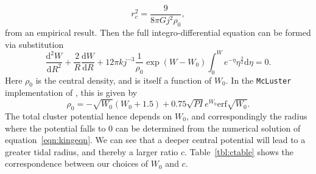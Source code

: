 \documentclass{princeton_astro_thesis}
\numberwithin{equation}{section}
\begin{document}
\begin{equation}
r_{c}^{2} = \frac{9}{8 \pi G j^2 \rho_0},
\end{equation}
from an empirical result. Then the full integro-differential equation can be formed via substitution
\begin{equation}
\frac{\mathrm{d}^2W}{\mathrm{d}R^2} + \frac{2}{R}\frac{\mathrm{d}W}{\mathrm{d}R} + 12 \pi k j^{-3} \frac{1}{\rho_{0}} \exp(W-W_{0}) \int_{0}^{W} e^{-\eta} \eta^\frac{3}{2} \mathrm{d}\eta = 0.
\label{eqn:kingeqn}
\end{equation}
Here $\rho_{0}$ is the central density, and is itself a function of $W_{0}$.  In the \texttt{McLuster} implementation of \citet{2011Kupper}, this is given by
\begin{equation}
\rho_{0} = -\sqrt{W_{0}}(W_{0}+1.5) + 0.75\sqrt{PI} e^{W_{0}} \mathrm{erf}{\sqrt{W_{0}}}.
\end{equation}
The total cluster potential hence depends on $W_{0}$, and correspondingly the radius where the potential falls to $0$ can be determined from the numerical solution of equation~\ref{eqn:kingeqn}.  We can see that a deeper central potential will lead to a greater tidal radius, and thereby a larger ratio $c$. Table~\ref{tbl:ctable} shows the correspondence between our choices of $W_{0}$ and $c$.
\end{document}
